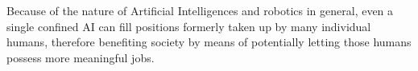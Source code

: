 Because of the nature of Artificial Intelligences and robotics in general, even a single confined AI can fill positions formerly taken up by many individual humans, therefore benefiting society by means of potentially letting those humans possess more meaningful jobs.